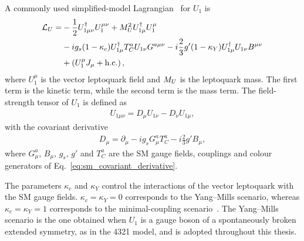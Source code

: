 A commonly used simplified-model Lagrangian~\cite{Cornella2019} for $U_{1}$ is
\begin{align}
    \mathcal{L}_{U}
    =
    &
    -\frac{1}{2}
    U_{1\mu\nu}^{\dagger}
    U_{1}^{\mu\nu}
    +
    M_U^{2}
    U_{1\mu}^{\dagger}
    U_{1}^{\mu}
    \nonumber\\
    &
    -ig_s(1-\kappa_{c})
    U_{1\mu}^{\dagger}
    T_{C}^{a}
    U_{1\nu}
    G^{a\mu\nu}
    -
    i\frac{2}{3}g'(1-\kappa_{Y})
    U_{1\mu}^{\dagger}
    U_{1\nu}
    B^{\mu\nu}
    \nonumber\\
    &
    +
    \left(
        U_{1}^{\mu}J_{\mu}
        +
        \mathrm{h.c.}
    \right),
    \label{eq:u1_full_lagrangian}
\end{align}
where $U_{1}^{\mu}$ is the vector leptoquark field and $M_U$ is the leptoquark mass. 
The first term is the kinetic term, while the second term is the mass term. 
The field-strength tensor of $U_{1}$ is defined as
\begin{align*}
    U_{1\mu\nu}
    =
    D_{\mu}U_{1\nu}
    -
    D_{\nu}U_{1\mu},
\end{align*}
with the covariant derivative
\begin{align*}
    D_{\mu}
    =
    \partial_{\mu}
    -
    ig_sG_{\mu}^{a}T_{C}^{a}
    -
    i\frac{2}{3}g'B_{\mu},
\end{align*}
where $G_{\mu}^{a}$, $B_{\mu}$, $g_s$, $g'$ and $T_{C}^{a}$ are the SM gauge fields, couplings and colour generators of Eq.~\eqref{eq:sm_covariant_derivative}. 

The parameters $\kappa_{c}$ and $\kappa_{Y}$ control the interactions
of the vector leptoquark with the SM gauge fields.
$\kappa_{c}=\kappa_{Y}=0$ corresponds to the Yang--Mills scenario,
whereas $\kappa_{c}=\kappa_{Y}=1$ corresponds to the minimal-coupling
scenario~\cite{Baker2019HighPTU1}.
The Yang--Mills scenario is the one obtained when $U_{1}$ is a gauge boson of a spontaneously broken extended symmetry, as in the 4321 model, and is adopted throughout this thesis.

